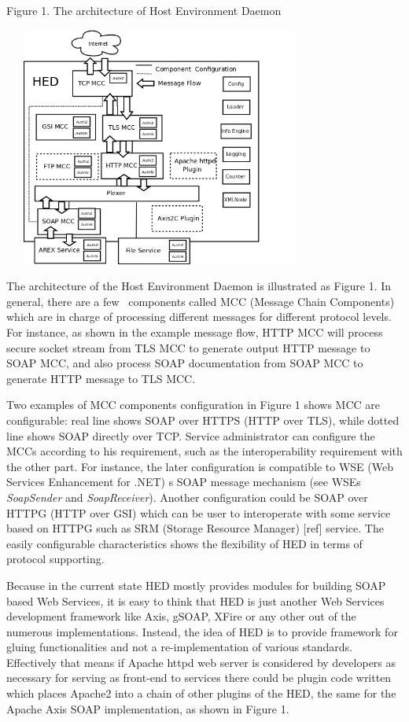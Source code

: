\documentclass{article}
\begin{document}
{\centering
Figure 1. The architecture of Host Environment Daemon
\par}

\begin{center}
\includegraphics[width=4.0673in,height=3.1047in]{Secpaper-img1.png}
\end{center}
The architecture of the Host Environment Daemon is illustrated as Figure
1. In general, there are a few \ components called MCC (Message Chain
Components) which are in charge of processing different messages for
different protocol levels. For instance, as shown in the example
message flow, HTTP MCC will process secure socket stream from TLS MCC
to generate output HTTP message to SOAP MCC, and also process SOAP
documentation from SOAP MCC to generate HTTP message to TLS MCC. 

Two examples of MCC components configuration in Figure 1 shows MCC are
configurable: real line shows SOAP over HTTPS (HTTP over TLS), while
dotted line shows SOAP directly over TCP. Service administrator can
configure the MCCs according to his requirement, such as the
interoperability requirement with the other part. For instance, the
later configuration is compatible to WSE (Web Services Enhancement for
.NET) {\textquotesingle}s SOAP message mechanism (see
WSE{\textquotesingle}s \textit{SoapSender} and \textit{SoapReceiver}).
Another configuration could be SOAP over HTTPG (HTTP over GSI) which
can be user to interoperate with some service based on HTTPG such as
SRM (Storage Resource Manager) [ref] service. The easily configurable
characteristics shows the flexibility of HED in terms of protocol
supporting.

Because in the current state HED mostly provides modules for building
SOAP based Web Services, it is easy to think that HED is just another
Web Services development framework like Axis, gSOAP, XFire or any other
out of the numerous implementations. Instead, the idea of HED is to
provide framework for gluing functionalities and not a
re-implementation of various standards. Effectively that means if
Apache httpd web server is considered by developers as necessary for
serving as front-end to services there could be plugin code written
which places Apache2 into a chain of other plugins of the HED, the same
for the Apache Axis SOAP implementation, as shown in Figure 1.
\end{document}
